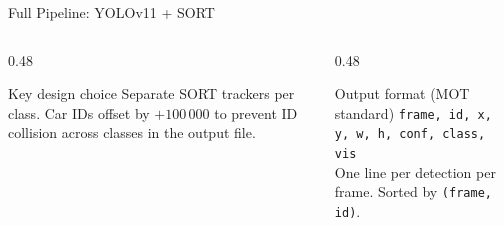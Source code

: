 \begin{frame}{Full Pipeline: YOLOv11 + SORT}
  \vspace{0.4em}
  \begin{columns}[T]
    \begin{column}{0.48\textwidth}
      \begin{block}{Key design choice}
        \small Separate SORT trackers per class.
        Car IDs offset by $+100\,000$ to prevent
        ID collision across classes in the output file.
      \end{block}
    \end{column}
    \begin{column}{0.48\textwidth}
      \begin{block}{Output format (MOT standard)}
        \scriptsize
        \texttt{frame, id, x, y, w, h, conf, class, vis}\\
        One line per detection per frame.
        Sorted by \texttt{(frame, id)}.
      \end{block}
    \end{column}
  \end{columns}
\end{frame}

